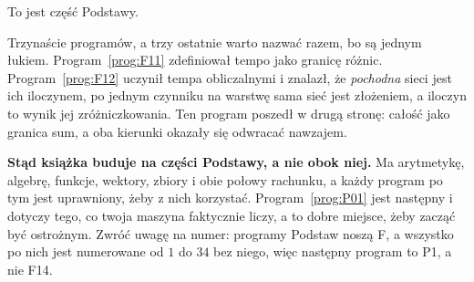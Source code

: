 \begin{fr}
To jest część Podstawy.

Trzynaście programów, a trzy ostatnie warto nazwać razem, bo są jednym łukiem.
Program~\ref{prog:F11} zdefiniował tempo jako granicę różnic.
Program~\ref{prog:F12} uczynił tempa obliczalnymi i znalazł, że
\emph{pochodna} sieci jest ich iloczynem, po jednym czynniku na warstwę
\dash{} sama sieć jest złożeniem, a iloczyn to wynik jej zróżniczkowania. Ten
program poszedł w drugą stronę: całość jako granica sum, a oba
kierunki okazały się odwracać nawzajem.

\textbf{Stąd książka buduje na części Podstawy, a nie obok niej.} Ma
arytmetykę, algebrę, funkcje, wektory, zbiory i obie połowy rachunku, a każdy
program po tym jest uprawniony, żeby z nich korzystać.
Program~\ref{prog:P01} jest następny i dotyczy tego, co twoja maszyna
faktycznie liczy, a to dobre miejsce, żeby zacząć być ostrożnym. Zwróć uwagę
na numer: programy Podstaw noszą F, a wszystko po nich jest numerowane od $1$
do $34$ bez niego, więc następny program to P1, a nie F14.
\end{fr}

